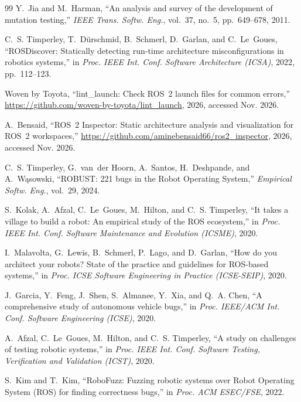\documentclass[conference]{IEEEtran}
\begin{document}
\begin{thebibliography}{99}
Y.~Jia and M.~Harman, ``An analysis and survey of the development of mutation testing,'' \emph{IEEE Trans. Softw. Eng.}, vol.~37, no.~5, pp.~649--678, 2011.

C.~S. Timperley, T.~D{\"u}rschmid, B.~Schmerl, D.~Garlan, and C.~Le~Goues, ``{ROSDiscover}:
Statically detecting run-time architecture misconfigurations in robotics systems,'' in
\emph{Proc. IEEE Int. Conf. Software Architecture (ICSA)}, 2022, pp.~112--123.

Woven by Toyota, ``lint\_launch: Check {ROS}~2 launch files for common errors,'' \url{https://github.com/woven-by-toyota/lint_launch}, 2026, accessed Nov. 2026.

A.~Bensaid, ``{ROS}~2 Inspector: Static architecture analysis and visualization for {ROS}~2 workspaces,'' \url{https://github.com/aminebensaid66/ros2_inspector}, 2026, accessed Nov. 2026.

C.~S. Timperley, G.~van~der Hoorn, A.~Santos, H.~Deshpande, and A.~W{\k{a}}sowski, ``{ROBUST}: 221 bugs in the Robot Operating System,'' \emph{Empirical Softw. Eng.}, vol.~29, 2024.

S.~Kolak, A.~Afzal, C.~Le~Goues, M.~Hilton, and C.~S. Timperley, ``It takes a village to build a robot: An empirical study of the {ROS} ecosystem,'' in \emph{Proc. IEEE Int. Conf. Software Maintenance and Evolution (ICSME)}, 2020.

I.~Malavolta, G.~Lewis, B.~Schmerl, P.~Lago, and D.~Garlan, ``How do you architect your robots? {State} of the practice and guidelines for {ROS}-based systems,'' in \emph{Proc. ICSE Software Engineering in Practice (ICSE-SEIP)}, 2020.

J.~Garcia, Y.~Feng, J.~Shen, S.~Almanee, Y.~Xia, and Q.~A. Chen, ``A comprehensive study of autonomous vehicle bugs,'' in \emph{Proc. IEEE/ACM Int. Conf. Software Engineering (ICSE)}, 2020.

A.~Afzal, C.~Le~Goues, M.~Hilton, and C.~S. Timperley, ``A study on challenges of testing robotic systems,'' in \emph{Proc. IEEE Int. Conf. Software Testing, Verification and Validation (ICST)}, 2020.

S.~Kim and T.~Kim, ``{RoboFuzz}: Fuzzing robotic systems over Robot Operating System ({ROS}) for finding correctness bugs,'' in \emph{Proc. ACM ESEC/FSE}, 2022.


\end{thebibliography}
\end{document}

